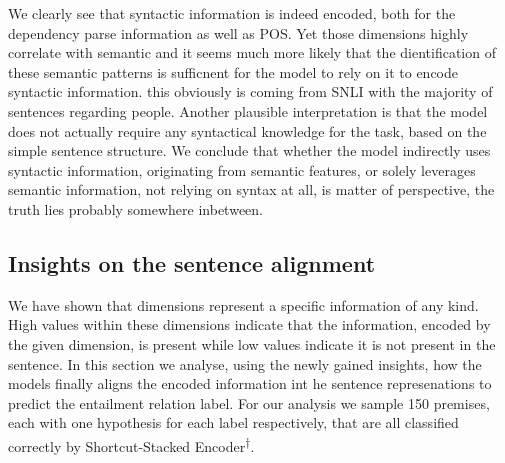 \noindent
We clearly see that syntactic information is indeed encoded, both for the dependency parse information as well as \ac{POS}. Yet those dimensions highly correlate with semantic and it seems much more likely that the dientification of these semantic patterns is sufficnent for the model to rely on it to encode syntactic information. this obviously is coming from \ac{SNLI} with the majority of sentences regarding people. Another plausible interpretation is that the model does not actually require any syntactical knowledge for the task, based on the simple sentence structure. We conclude that whether the model indirectly uses syntactic information, originating from semantic features, or solely leverages semantic information, not relying on syntax at all, is matter of perspective, the truth lies probably somewhere inbetween. 

\subsection{Insights on the sentence alignment}\label{sec:insights_sent_alignment}
We have shown that dimensions represent a specific information of any kind. High values within these dimensions indicate that the information, encoded by the given dimension, is present while low values indicate it is not present in the sentence. In this section we analyse, using the newly gained insights, how the models finally aligns the encoded information int he sentence represenations to predict the entailment relation label. For our analysis we sample 150 premises, each with one hypothesis for each label respectively, that are all classified correctly by Shortcut-Stacked Encoder\textsuperscript{$\dagger$}. 

